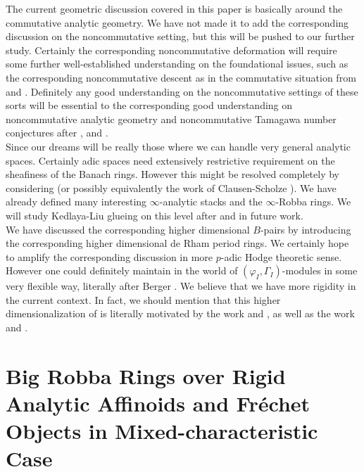 \documentclass[12pt]{amsart}
\theoremstyle{definition}
\numberwithin{equation}{section}
\begin{document}
\indent The current geometric discussion covered in this paper is basically around the commutative analytic geometry. We have not made it to add the corresponding discussion on the noncommutative setting, but this will be pushed to our further study. Certainly the corresponding noncommutative deformation will require some further well-established understanding on the foundational issues, such as the corresponding noncommutative descent as in the commutative situation from \cite{KL1} and \cite{KL2}. Definitely any good understanding on the noncommutative settings of these sorts will be essential to the corresponding good understanding on noncommutative analytic geometry and noncommutative Tamagawa number conjectures after \cite{FK1}, \cite{BF1} and \cite{BF2}.  \\


\indent Since our dreams will be really those where we can handle very general analytic spaces. Certainly adic spaces need extensively restrictive requirement on the sheafiness of the Banach rings. However this might be resolved completely by considering \cite{BK} (or possibly equivalently the work of Clausen-Scholze \cite{CS}). We have already defined many interesting $\infty$-analytic stacks and the $\infty$-Robba rings. We will study Kedlaya-Liu glueing on this level after \cite{KL1} and \cite{KL2} in future work.\\ 


\indent We have discussed the corresponding higher dimensional $B$-pairs by introducing the corresponding higher dimensional de Rham period rings. We certainly hope to amplify the corresponding discussion in more $p$-adic Hodge theoretic sense. However one could definitely maintain in the world of $(\varphi_I,\Gamma_I)$-modules in some very flexible way, literally after Berger \cite{Ber2}. We believe that we have more rigidity in the current context. In fact, we should mention that this higher dimensionalization of \cite{Ber2} is literally motivated by the work \cite{KL1} and \cite{KL2}, as well as the work \cite{CKZ} and \cite{PZ}.











\newpage


\section{Big Robba Rings over Rigid Analytic Affinoids and Fr\'echet Objects in Mixed-characteristic Case}
\end{document}
